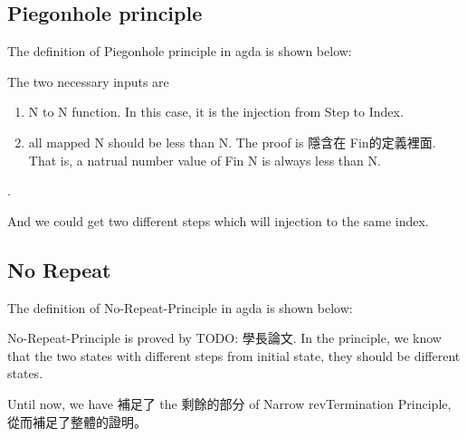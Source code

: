 \subsection{ Piegonhole principle }
The definition of Piegonhole principle in agda is shown below:



The two necessary inputs are 
\begin{enumerate}[1.]
    \item N to N function. In this case, it is the injection from Step to Index. 
    \item all mapped N should be less than N.  The proof is 隱含在 Fin的定義裡面.  That is, a natrual number value of Fin N is always less than N.
\end{enumerate}.

And we could get two different steps which will injection to the same index.

\subsection{ No Repeat }
The definition of No-Repeat-Principle in agda is shown below:

No-Repeat-Principle is proved by {TODO: 學長論文}.  In the principle, we know that the two states with different steps from initial state, they should be different states.


Until now, we have 補足了 the 剩餘的部分 of Narrow revTermination Principle, 從而補足了整體的證明。